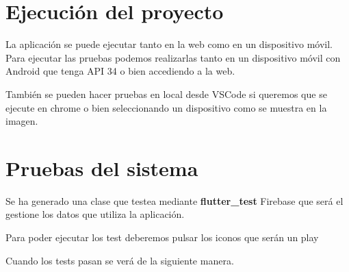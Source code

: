 \section{Ejecución del proyecto}
La aplicación se puede ejecutar tanto en la web como en un dispositivo móvil. Para ejecutar las pruebas podemos realizarlas tanto en un dispositivo móvil con Android que tenga API 34 o bien accediendo a la web.

También se pueden hacer pruebas en local desde VSCode \fboxrule=1pt\fboxsep=4pt si queremos que se ejecute en chrome o bien seleccionando un dispositivo como se muestra en la imagen.

\section{Pruebas del sistema}
Se ha generado una clase que testea mediante \textbf{flutter\_test} Firebase que será el gestione los datos que utiliza la aplicación.

Para poder ejecutar los test deberemos pulsar los iconos que serán un play

Cuando los tests pasan se verá de la siguiente manera.
